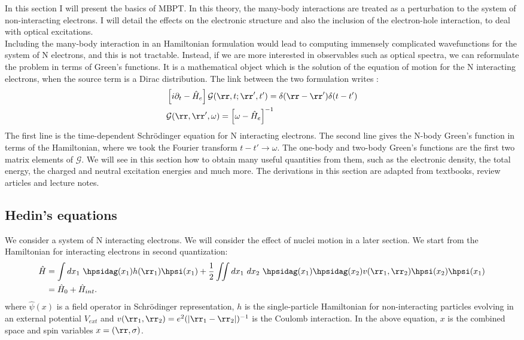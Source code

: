 In this section I will present the basics of \acrfull{MBPT}. In this theory, the many-body interactions are treated as a perturbation to the system of non-interacting electrons. I will detail the effects on the electronic structure and also the inclusion of the electron-hole interaction, to deal with optical excitations. \\
Including the many-body interaction in an Hamiltonian formulation would lead to computing immensely complicated wavefunctions for the system of N electrons, and this is not tractable. Instead, if we are more interested in observables such as optical spectra, we can reformulate the problem in terms of Green's functions. It is a mathematical object which is the solution of the equation of motion for the N interacting electrons, when the source term is a Dirac distribution. The link between the two formulation writes :
\begin{align}
\begin{split}
	&\left[ i \partial_t - \hat{H}_e \right] \mathcal{G}(\rr,t;\rr',t') = \delta(\rr-\rr')\delta(t-t') \\
	&\mathcal{G}(\rr,\rr',\omega) = \left[\omega - \hat{H}_e\right]^{-1}
\end{split}	
\end{align}
The first line is the time-dependent Schrödinger equation for N interacting electrons. The second line gives the N-body Green's function in terms of the Hamiltonian, where we took the Fourier transform $t-t' \to \omega$. The one-body and two-body Green's functions are the first two matrix elements of $\mathcal{G}$. We will see in this section how to obtain many useful quantities from them, such as the electronic density, the total energy, the charged and neutral excitation energies and much more. 
The derivations in this section are adapted from textbooks,\cite{martin2016interacting,stefanucci2013nonequilibrium} review articles \cite{strinati1988application,aryasetiawan1998gw,giustino2017review} and lecture notes.\cite{JulienToulouseNotes}

\subsection{Hedin's equations}
We consider a system of N interacting electrons. We will consider the effect of nuclei motion in a later section.
We start from the Hamiltonian for interacting electrons in second quantization:
\begin{align}
\begin{split}
 	\hat{H} &= \int dx_1 \ \hpsidag(x_1) h(\rr_1) \hpsi(x_1) + \frac{1}{2} \iint dx_1 \  dx_2 \ \hpsidag(x_1) \hpsidag(x_2) v(\rr_1,\rr_2) \hpsi(x_2)\hpsi(x_1) \\
		&= \hat{H}_0 + \hat{H}_{int}.
\end{split}
\end{align}
where $\hat{\psi}(x)$ is a field operator in Schrödinger representation, $h$ is the single-particle Hamiltonian for non-interacting particles evolving in an external potential $V_{ext}$ and $v(\rr_1,\rr_2) = e^2 (\left| \rr_1 - \rr_2 \right|)^{-1}$ is the Coulomb interaction. In the above equation, $x$ is the combined space and spin variables $x = (\rr, \sigma)$.
%


